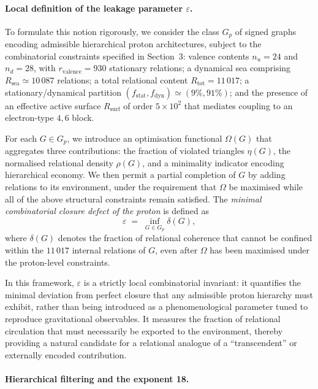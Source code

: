 \documentclass[11pt,a4paper]{article}
\begin{document}
\paragraph{Local definition of the leakage parameter $\varepsilon$.}

To formulate this notion rigorously, we consider the class $G_p$ of signed graphs encoding admissible hierarchical proton architectures, subject to the combinatorial constraints specified in Section~3: valence contents $n_u = 24$ and $n_d = 28$, with $r_{\text{valence}} = 930$ stationary relations; a dynamical sea comprising $R_{\text{sea}} \simeq 10\,087$ relations; a total relational content $R_{\text{tot}} = 11\,017$; a stationary/dynamical partition $(f_{\text{stat}}, f_{\text{dyn}}) \simeq (9\%, 91\%)$; and the presence of an effective active surface $R_{\text{surf}}$ of order $5 \times 10^2$ that mediates coupling to an electron-type $4,6$ block.

For each $G \in G_p$, we introduce an optimisation functional $\Omega(G)$ that aggregates three contributions: the fraction of violated triangles $\eta(G)$, the normalised relational density $\rho(G)$, and a minimality indicator encoding hierarchical economy. We then permit a partial completion of $G$ by adding relations to its environment, under the requirement that $\Omega$ be maximised while all of the above structural constraints remain satisfied. The \emph{minimal combinatorial closure defect of the proton} is defined as
\[
  \varepsilon \;=\; \inf_{G \in G_p} \delta(G),
\]
where $\delta(G)$ denotes the fraction of relational coherence that cannot be confined within the $11\,017$ internal relations of $G$, even after $\Omega$ has been maximised under the proton-level constraints.

In this framework, $\varepsilon$ is a strictly local combinatorial invariant: it quantifies the minimal deviation from perfect closure that any admissible proton hierarchy must exhibit, rather than being introduced as a phenomenological parameter tuned to reproduce gravitational observables. It measures the fraction of relational circulation that must necessarily be exported to the environment, thereby providing a natural candidate for a relational analogue of a ``transcendent'' or externally encoded contribution.

\paragraph{Hierarchical filtering and the exponent 18.}
\end{document}
